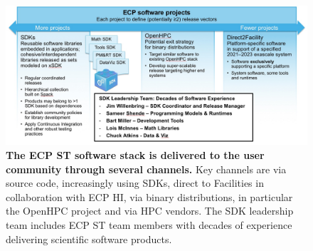 \begin{figure}
	\centering
	\includegraphics[width=0.9\linewidth]{SoftwareStack}
	\caption{\textbf{The ECP ST software stack is delivered to the user community through several channels.} Key channels are via source code, increasingly using SDKs, direct to Facilities in collaboration with ECP HI, via binary distributions, in particular the OpenHPC project and via HPC vendors.  The SDK leadership team includes  ECP ST team members with decades of experience delivering scientific software products.}
	\label{fig:softwarestack}
\end{figure}

